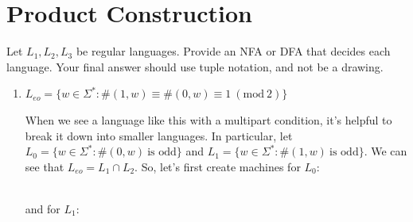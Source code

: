 \documentclass[fleqn]{article}
\begin{document}
\section{Product Construction}
Let $L_1, L_2, L_3$ be regular languages. Provide an NFA or DFA that decides each language. Your final answer should use tuple notation, and not be a drawing.
\begin{enumerate}
    \item $L_{eo} = \{w \in \Sigma^* : \#(1,w) \equiv \#(0, w) \equiv 1~(\text{mod}~2)\}$
    \begin{answer}
        When we see a language like  this with a multipart condition, it's helpful to break it down into smaller languages. In particular, let
        $L_0 = \{w \in \Sigma^* : \#(0, w)~\text{is odd}\}$ and $L_1 = \{w \in \Sigma^* : \#(1, w)~\text{is odd}\}$. We can see that $L_{eo} = L_1 \cap L_2$. So, let's first create machines for $L_0$: \\
         \\
        and for $L_1$: \\
\end{answer}
\end{enumerate}
\end{document}
